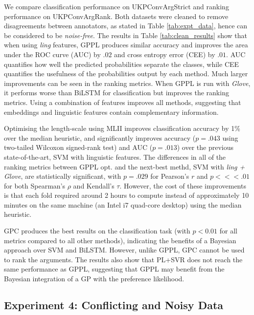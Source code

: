 We compare classification performance on UKPConvArgStrict  
and ranking performance on UKPConvArgRank. 
Both datasets were cleaned to remove disagreements between annotators, as stated in Table \ref{tab:expt_data}, hence can be considered to be \emph{noise-free}.
The results in Table \ref{tab:clean_results} show that when using \emph{ling} features,
GPPL produces similar accuracy and improves the area under the ROC curve (AUC) by $.02$ and cross entropy error (CEE) by $.01$.
AUC quantifies how well the predicted probabilities separate the classes,
while CEE quantifies the usefulness of the probabilities output by each method.
Much larger improvements can be seen in the ranking metrics. 
When GPPL is run with \emph{Glove}, it performs worse than
BiLSTM for classification but improves the ranking metrics. Using a combination of features improves all methods, suggesting that embeddings and linguistic features contain complementary information.

Optimising the length-scale using MLII improves classification accuracy by 1\% over the median heuristic,
and significantly improves accuracy ($p=.043$ using two-tailed Wilcoxon signed-rank test) and AUC ($p=.013$) 
over the previous state-of-the-art, SVM with linguistic features.
The differences in all of the ranking metrics between GPPL opt. and the next-best methd, SVM with \emph{ling + Glove}, 
are statistically significant, with $p=.029$ for Pearson's $r$ and $p<<<.01$ for both 
Spearman's $\rho$ and Kendall's $\tau$.
However, the cost of these improvements is that each fold required around 2 hours to compute instead of 
approximately 10 minutes on the same machine (an Intel i7 quad-core desktop) using the median heuristic. 

GPC produces the best results on the classification task (with $p < 0.01$ for all metrics compared to all other methods), 
indicating the benefits of a Bayesian approach over SVM and BiLSTM.
However, unlike GPPL, GPC cannot be used to rank the arguments.
The results also show that PL+SVR does not reach the same performance as GPPL, 
suggesting that GPPL may benefit from the Bayesian integration of a GP with the preference likelihood. 

\subsection{Experiment 4: Conflicting and Noisy Data}

